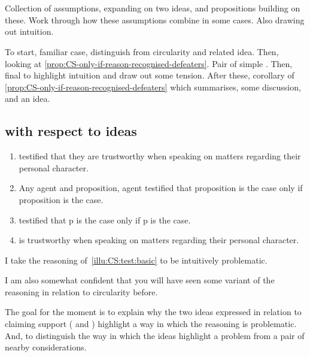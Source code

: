 \section{}
\label{sec:CS:illustrations}

\begin{note}
  Collection of assumptions, expanding on two ideas, and propositions building on these.
  Work through how these assumptions combine in some cases.
  Also drawing out intuition.

  To start, familiar case, distinguish from circularity and related idea.
  Then, looking at \autoref{prop:CS-only-if-reason-recognised-defeaters}.
  Pair of simple .
  Then, final  to highlight intuition and draw out some tension.
  After these, corollary of \autoref{prop:CS-only-if-reason-recognised-defeaters} which summarises, some discussion, and an idea.
\end{note}

\subsection{ with respect to ideas}

\begin{note}[Testimony 1]
  \begin{illustration}[Testimony 1]
    \label{illu:CS:test:basic}
    \mbox{}
    \begin{enumerate}[label=\arabic*., ref=(\arabic*)]
    \item\label{ex:eiS:t:basic:test}  testified that they are trustworthy when speaking on matters regarding their personal character.
    \item Any agent and proposition, agent testified that proposition is the case only if proposition is the case.
    \item {} testified that p is the case only if p is the case.
    \item\label{ex:eiS:t:basic:ok}  is trustworthy when speaking on matters regarding their personal character.
    \end{enumerate}
  \end{illustration}

  I take the reasoning of~\autoref{illu:CS:test:basic} to be intuitively problematic.

  I am also somewhat confident that you will have seen some variant of the reasoning in relation to circularity before.

  The goal for the moment is to explain why the two ideas expressed in relation to claiming support (\nfcs{} and \eiS{}) highlight a way in which the reasoning is problematic.
  And, to distinguish the way in which the ideas highlight a problem from a pair of nearby considerations.
\end{note}

